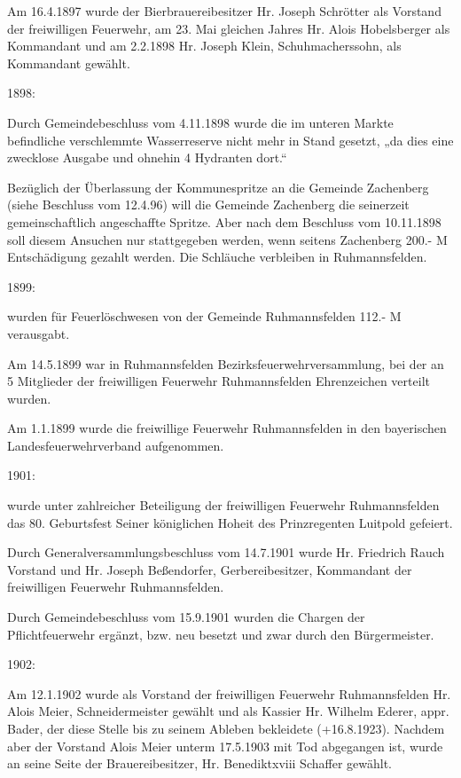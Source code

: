 \documentclass{book}
\begin{document}
Am 16.4.1897 wurde der Bierbrauereibesitzer Hr. Joseph Schrötter als Vorstand
der freiwilligen Feuerwehr, am 23. Mai gleichen Jahres Hr. Alois Hobelsberger
als Kommandant und am 2.2.1898 Hr. Joseph Klein, Schuhmacherssohn, als
Kommandant gewählt.

1898:

Durch Gemeindebeschluss vom 4.11.1898 wurde die im unteren Markte befindliche
verschlemmte Wasserreserve nicht mehr in Stand gesetzt, „da dies eine zwecklose
Ausgabe und ohnehin 4 Hydranten dort.“

Bezüglich der Überlassung der Kommunespritze an die Gemeinde Zachenberg (siehe
Beschluss vom 12.4.96) will die Gemeinde Zachenberg die seinerzeit
gemeinschaftlich angeschaffte Spritze. Aber nach dem Beschluss vom 10.11.1898
soll diesem Ansuchen nur stattgegeben werden, wenn seitens Zachenberg 200.- M
Entschädigung gezahlt werden. Die Schläuche verbleiben in Ruhmannsfelden.

1899:

wurden für Feuerlöschwesen von der Gemeinde Ruhmannsfelden 112.- M verausgabt.

Am 14.5.1899 war in Ruhmannsfelden Bezirksfeuerwehrversammlung, bei der an 5
Mitglieder der freiwilligen Feuerwehr Ruhmannsfelden Ehrenzeichen verteilt
wurden.

Am 1.1.1899 wurde die freiwillige Feuerwehr Ruhmannsfelden in den bayerischen
Landesfeuerwehrverband aufgenommen.

1901:

wurde unter zahlreicher Beteiligung der freiwilligen Feuerwehr Ruhmannsfelden
das 80. Geburtsfest Seiner königlichen Hoheit des Prinzregenten Luitpold
gefeiert.

Durch Generalversammlungsbeschluss vom 14.7.1901 wurde Hr. Friedrich Rauch
Vorstand und Hr. Joseph Beßendorfer, Gerbereibesitzer, Kommandant der
freiwilligen Feuerwehr Ruhmannsfelden.

Durch Gemeindebeschluss vom 15.9.1901 wurden die Chargen der Pflichtfeuerwehr
ergänzt, bzw. neu besetzt und zwar durch den Bürgermeister.

1902:

Am 12.1.1902 wurde als Vorstand der freiwilligen Feuerwehr Ruhmannsfelden Hr.
Alois Meier, Schneidermeister gewählt und als Kassier Hr. Wilhelm Ederer, appr.
Bader, der diese Stelle bis zu seinem Ableben bekleidete (+16.8.1923). Nachdem
aber der Vorstand Alois Meier unterm 17.5.1903 mit Tod abgegangen ist, wurde an
seine Seite der Brauereibesitzer, Hr. Benediktxviii Schaffer gewählt.
\end{document}
